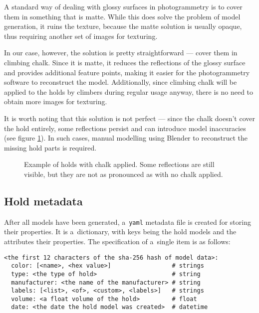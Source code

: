 A standard way of dealing with glossy surfaces in photogrammetry is to cover them in something that is matte.
While this does solve the problem of model generation, it ruins the texture, because the matte solution is usually opaque, thus requiring another set of images for texturing.

In our case, however, the solution is pretty straightforward --- cover them in climbing chalk.
Since it is matte, it reduces the reflections of the glossy surface and provides additional feature points, making it easier for the photogrammetry software to reconstruct the model.
Additionally, since climbing chalk will be applied to the holds by climbers during regular usage anyway, there is no need to obtain more images for texturing.

It is worth noting that this solution is not perfect --- since the chalk doesn't cover the hold entirely, some reflections persist and can introduce model inaccuracies (see figure \ref{fig:chalk}).
In such cases, manual modelling using Blender \cite{blender} to reconstruct the missing hold parts is required.

\begin{figure}[t]
	\centering
	\hfill%
	\hfill%
	\caption{Example of holds with chalk applied. Some reflections are still visible, but they are not as pronounced as with no chalk applied.}%
	\label{fig:chalk}%
\end{figure}

\subsection{Hold metadata}
After all models have been generated, a~\verb|yaml| metadata file is created for storing their properties.
It is a~dictionary, with keys being the hold models and the attributes their properties.
The specification of a~single item is as follows:

\begin{verbatim}
<the first 12 characters of the sha-256 hash of model data>:
  color: [<name>, <hex value>]                 # strings
  type: <the type of hold>                     # string
  manufacturer: <the name of the manufacturer> # string
  labels: [<list>, <of>, <custom>, <labels>]   # strings
  volume: <a float volume of the hold>         # float
  date: <the date the hold model was created>  # datetime
\end{verbatim}

